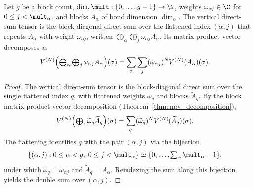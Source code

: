 \begin{lemma}
    \label{lem:mpv_vertical_assembled}
    \leanok
    Let $g$ be a block count,
    $\dim,\mult:\{0,\ldots,g-1\}\to\N$, weights
    $\omega_{\alpha j}\in\C$ for $0\leq j<\mult_\alpha$, and blocks
    $A_\alpha$ of bond dimension $\dim_\alpha$. The vertical direct-sum tensor is the
    block-diagonal direct sum over the flattened index $(\alpha,j)$ that repeats
    $A_\alpha$ with weight $\omega_{\alpha j}$, written
    $\bigoplus_\alpha\bigoplus_j\omega_{\alpha j}A_\alpha$. Its matrix product
    vector decomposes as
    \begin{align}
        V^{(N)}\Bigl(\textstyle\bigoplus_\alpha\bigoplus_j
        \omega_{\alpha j}A_\alpha\Bigr)(\sigma)
         & =\sum_\alpha\sum_j(\omega_{\alpha j})^N
        V^{(N)}(A_\alpha)(\sigma).
        \label{eq:mpdo_vertical_mpv_sum}
    \end{align}
\end{lemma}
\begin{proof}\leanok
    The vertical direct-sum tensor is the block-diagonal direct sum over the single
    flattened index $q$, with flattened weights $\widetilde\omega_q$ and blocks
    $\widetilde A_q$. By the block matrix-product-vector decomposition
    (Theorem~\ref{thm:mpv_decomposition}),
    \begin{align}
        V^{(N)}\Bigl(\textstyle\bigoplus_q
        \widetilde\omega_q\widetilde A_q\Bigr)(\sigma)
         & =\sum_q(\widetilde\omega_q)^N
        V^{(N)}(\widetilde A_q)(\sigma).
        \notag
    \end{align}
    The flattening identifies $q$ with the pair $(\alpha,j)$ via the bijection
    \begin{align}
        \{(\alpha,j):0\leq\alpha<g,\ 0\leq j<\mult_\alpha\}
         & \simeq
        \{0,\ldots,\textstyle\sum_\alpha\mult_\alpha-1\},
        \notag
    \end{align}
    under which $\widetilde\omega_q=\omega_{\alpha j}$ and
    $\widetilde A_q=A_\alpha$. Reindexing the sum along this bijection yields the
    double sum over $(\alpha,j)$.
\end{proof}

